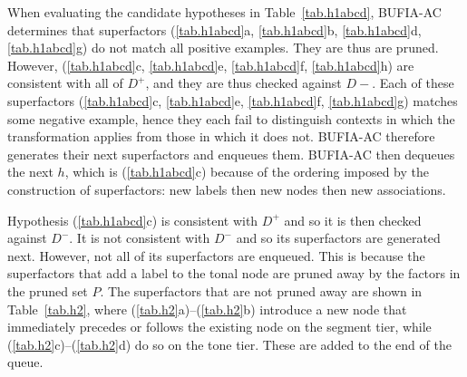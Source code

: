 \documentclass[pmlr]{jmlr}%
\newcommand{\hihan}[1]{%
	\textcolor{orange}{\textbf{[#1]}}%
}
\begin{document}
	
	
	When evaluating the candidate hypotheses in Table~\ref{tab.h1abcd},
	BUFIA-AC determines that superfactors (\ref{tab.h1abcd}a, \ref{tab.h1abcd}b, \ref{tab.h1abcd}d, \ref{tab.h1abcd}g)
	do not match all positive examples. They are thus are pruned. 
	However, (\ref{tab.h1abcd}c, \ref{tab.h1abcd}e, \ref{tab.h1abcd}f, \ref{tab.h1abcd}h) are consistent with all of \(D^+\), and they are thus checked against \(D-\).
	Each of these superfactors (\ref{tab.h1abcd}c, \ref{tab.h1abcd}e, \ref{tab.h1abcd}f, \ref{tab.h1abcd}g) matches some negative
	example, hence they each fail to distinguish contexts in which the
	transformation applies from those in which it does not.
	BUFIA-AC therefore generates their next superfactors and enqueues them.
	BUFIA-AC then dequeues the next \(h\), which is (\ref{tab.h1abcd}c) because of the ordering imposed by the construction of superfactors: new labels then new nodes then new associations.
	
	
	Hypothesis (\ref{tab.h1abcd}c) is consistent with \(D^+\) and so it is then checked against \(D^-\).
	It is not consistent  with \(D^-\) and so its superfactors are generated next.
	However, not all of its superfactors are enqueued.
	This is because the superfactors that add a label to the tonal node are pruned away by the factors in the pruned set \(P\).
	The superfactors that are not pruned away are  shown in Table~\ref{tab.h2}, where
	(\ref{tab.h2}a)--(\ref{tab.h2}b) introduce a new node that immediately precedes or follows the existing node on the segment tier, while (\ref{tab.h2}c)--(\ref{tab.h2}d) do so on the tone tier.
	These are added to the end of the queue.
	
\end{document}
